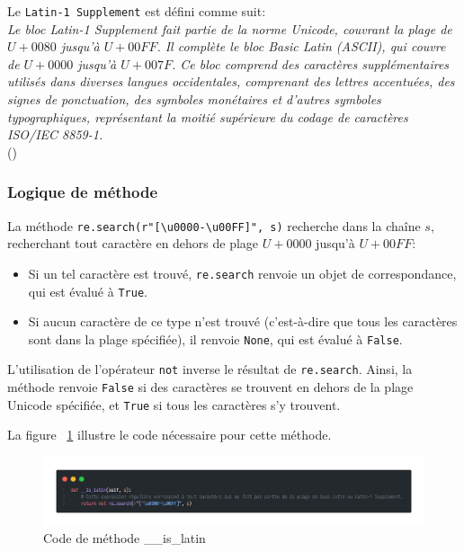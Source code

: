 \newpage
\noindent
Le \texttt{Latin-1 Supplement} est défini comme suit: \\
\textit{Le bloc Latin-1 Supplement fait partie de la norme Unicode, couvrant la plage de \( U+0080 \) jusqu'à \( U+00FF \). Il complète le bloc Basic Latin (ASCII), qui couvre de \( U+0000 \) jusqu'à \( U+007F \). Ce bloc comprend des caractères supplémentaires utilisés dans diverses langues occidentales, comprenant des lettres accentuées, des signes de ponctuation, des symboles monétaires et d'autres symboles typographiques, représentant la moitié supérieure du codage de caractères ISO/IEC 8859-1.} \\
 (\cite{symbl:latin1supp})


\subsubsection{Logique de méthode}
\noindent
La méthode \texttt{re.search(r"[\textbackslash u0000-\textbackslash u00FF]", s)} recherche dans la chaîne \( s \), recherchant tout caractère en dehors de plage \( U+0000 \) jusqu'à \( U+00FF \):
\begin{itemize}
	\item Si un tel caractère est trouvé, \texttt{re.search} renvoie un objet de correspondance, qui est évalué à \texttt{True}.
	\item Si aucun caractère de ce type n'est trouvé (c'est-à-dire que tous les caractères sont dans la plage spécifiée), il renvoie \texttt{None}, qui est évalué à \texttt{False}.
\end{itemize}
L'utilisation de l'opérateur \texttt{not} inverse le résultat de \texttt{re.search}. Ainsi, la méthode renvoie \texttt{False} si des caractères se trouvent en dehors de la plage Unicode spécifiée, et \texttt{True} si tous les caractères s'y trouvent.

\noindent
La figure ~\ref{fig:islatin} illustre le code nécessaire pour cette méthode.

\begin{figure}[H]
	\centering
	\includegraphics[width=1\textwidth]{logos/islatin.png}
	\caption{Code de méthode \_\_is\_latin}
	\label{fig:islatin}
\end{figure}

